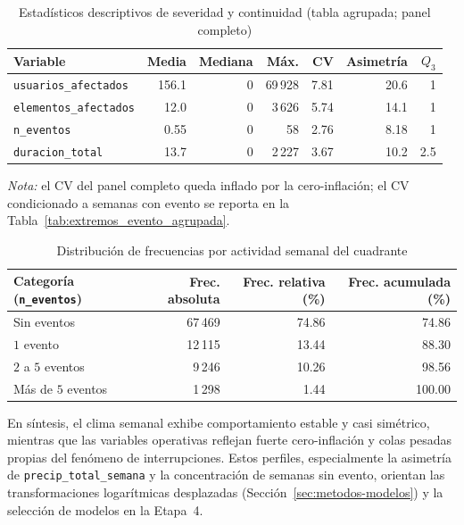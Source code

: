    \begin{table}[!htbp]
    \centering
    \small
    \caption{Estadísticos descriptivos de severidad y continuidad (tabla agrupada; panel completo)}
    \label{tab:desc_evento_agrupada}
    \begin{tabular}{l r r r r r r}
\toprule
    \textbf{Variable} & \textbf{Media} & \textbf{Mediana} & \textbf{Máx.} & \textbf{CV} & \textbf{Asimetría} & \textbf{$Q_3$} \\
\midrule
    \texttt{usuarios\_afectados}  & 156.1 & 0 & 69\,928 & 7.81 & 20.6 & 1 \\
    \texttt{elementos\_afectados} & 12.0  & 0 & 3\,626  & 5.74 & 14.1 & 1 \\
    \texttt{n\_eventos}            & 0.55  & 0 & 58       & 2.76 & 8.18 & 1 \\
    \texttt{duracion\_total}      & 13.7  & 0 & 2\,227  & 3.67 & 10.2 & 2.5 \\
    \bottomrule
    \end{tabular}
    
    \noindent\textit{Nota:} el CV del panel completo queda inflado por la cero-inflación; el CV condicionado a semanas con evento se reporta en la Tabla~\ref{tab:extremos_evento_agrupada}.
    \end{table}
    
    \begin{table}[!htbp]
    \centering
    \small
    \caption{Distribución de frecuencias por actividad semanal del cuadrante}
    \label{tab:frecuencias_actividad_agrupada}
    \begin{tabular}{l r r r}
    \toprule
    \textbf{Categoría (\texttt{n\_eventos})} & \textbf{Frec. absoluta} & \textbf{Frec. relativa (\%)} & \textbf{Frec. acumulada (\%)} \\
    \midrule
    Sin eventos           & 67\,469 & 74.86 & 74.86 \\
    $1$ evento            & 12\,115 & 13.44 & 88.30 \\
    $2$ a $5$ eventos     &  9\,246 & 10.26 & 98.56 \\
    Más de $5$ eventos    &  1\,298 &  1.44 & 100.00 \\
\bottomrule
    \end{tabular}
    \end{table}
    
    
    
    
    \noindent En síntesis, el clima semanal exhibe comportamiento estable y casi simétrico, mientras que las variables operativas reflejan fuerte cero-inflación y colas pesadas propias del fenómeno de interrupciones. Estos perfiles, especialmente la asimetría de \texttt{precip\_total\_semana} y la concentración de semanas sin evento, orientan las transformaciones logarítmicas desplazadas (Sección~\ref{sec:metodos-modelos}) y la selección de modelos en la Etapa~4.

